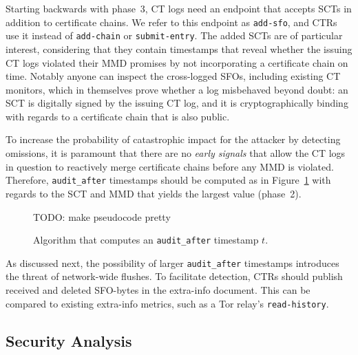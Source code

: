 Starting backwards with phase~3, CT logs need an endpoint that accepts SCTs in
addition to certificate chains.  We refer to this endpoint as
\texttt{add-sfo}, and CTRs use it instead of \texttt{add-chain} or
\texttt{submit-entry}.  The added SCTs are of particular interest,
considering that they contain timestamps that reveal whether the issuing CT logs
violated their MMD promises by not incorporating a certificate chain on time.
Notably anyone can inspect the cross-logged SFOs, including existing CT
monitors, which in themselves prove whether a log misbehaved beyond doubt:
	an SCT is digitally signed by the issuing CT log, and
	it is cryptographically binding with regards to a certificate chain that
		is also public.

To increase the probability of catastrophic impact for the attacker by detecting
omissions, it is paramount that there are no \emph{early signals} that
allow the CT logs in question to reactively merge certificate chains before
any MMD is violated.  Therefore, \texttt{audit\_after} timestamps should be
computed as in Figure~\ref{fig:audit-after} with regards to the SCT and MMD that
yields the largest value (phase~2).

\begin{figure}
	\centering
	TODO: make pseudocode pretty
	\caption{%
		Algorithm that computes an \texttt{audit\_after} timestamp $t$.
	}
	\label{fig:audit-after}
\end{figure}

As discussed next, the possibility of larger \texttt{audit\_after} timestamps
introduces the threat of network-wide flushes.  To facilitate detection, CTRs
should publish received and deleted SFO-bytes in the extra-info document.  This
can be compared to existing extra-info metrics, such as a Tor relay's
\texttt{read-history}.

\subsection{Security Analysis}
